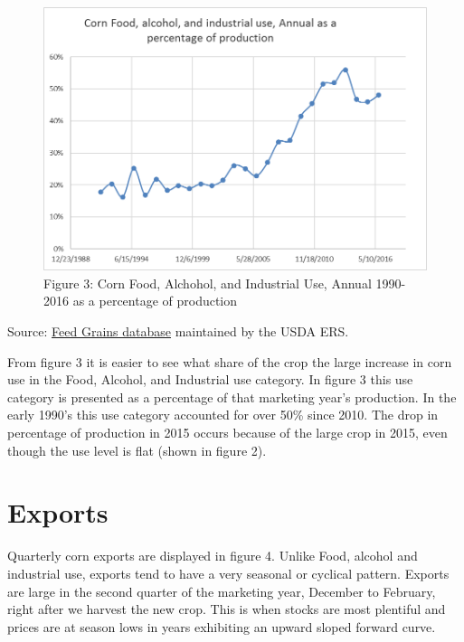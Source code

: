 \documentclass[]{book}
\theoremstyle{definition}
\theoremstyle{definition}
\theoremstyle{remark}
\begin{document}
\begin{figure}[htbp]
\centering
\includegraphics{Excel-files/IntroductiontoCommodityTS-FeedGrains_Corn_files/image009.png}
\caption{Figure 3: Corn Food, Alchohol, and Industrial Use, Annual
1990-2016 as a percentage of production}
\end{figure}

Source:
\href{http://www.ers.usda.gov/data-products/feed-grains-database/feed-grains-yearbook-tables.aspx\#26780}{Feed
Grains database} maintained by the USDA ERS.

From figure 3 it is easier to see what share of the crop the large
increase in corn use in the Food, Alcohol, and Industrial use category.
In figure 3 this use category is presented as a percentage of that
marketing year's production. In the early 1990's this use category
accounted for over 50\% since 2010. The drop in percentage of production
in 2015 occurs because of the large crop in 2015, even though the use
level is flat (shown in figure 2).

\section{Exports}\label{exports}

Quarterly corn exports are displayed in figure 4. Unlike Food, alcohol
and industrial use, exports tend to have a very seasonal or cyclical
pattern. Exports are large in the second quarter of the marketing year,
December to February, right after we harvest the new crop. This is when
stocks are most plentiful and prices are at season lows in years
exhibiting an upward sloped forward curve.
\end{document}
